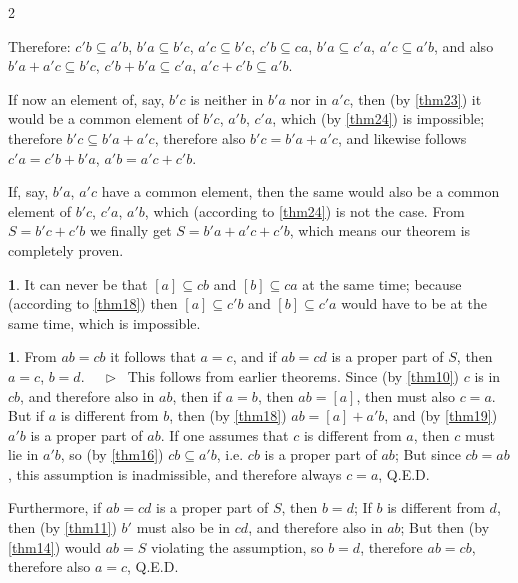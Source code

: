\documentclass[leqno,hidelinks,10pt]{article}
\theoremstyle{definition}
\newtheorem{satz}{\protect\satzname}
\newtheorem*{zusatz}{\protect\zusatzname}
\newcommand{\satzname}{}
\newcommand{\zusatzname}{}
\renewcommand{\satzname}{\hspace{-4pt}.\ Satz}%
\renewcommand{\zusatzname}{Zusatz}%
\renewcommand{\satzname}{\hspace{-4pt}.\ Theorem}%
\renewcommand{\zusatzname}{Corollary}%
\newcommand\Beweis{\medskip \newline $ \phantom{'.'} \rhd \ $}%
\newcommand{\QED}{Q.E.D.}
\newcommand{\partof}{\subseteq}
\newcommand{\sref}[1]{\underline{\ref{#1}}}%
\begin{document}
\begin{paracol}{2}
\begin{leftcolumn}

\end{leftcolumn}

\begin{rightcolumn}

\justifying

\normalsize

\noindent
Therefore: $c'b \partof a'b$, $b'a \partof b'c$, $a'c \partof b'c$,
$c'b \partof ca$, $b'a \partof c'a$, $a'c \partof a'b$, and also
$b'a + a'c \partof b'c$, $c'b + b'a \partof c'a$, $a'c + c'b \partof a'b$.



If now an element of, say, $b'c$ is neither in $b'a$ nor in $a'c$, then
(by \sref{thm23}) it would be a common element of $b'c$, $a'b$, $c'a$,
which (by \sref{thm24}) is impossible; therefore $b'c \partof b'a + a'c$,
therefore also $b'c=b'a + a'c$, and likewise follows $c'a=c'b+b'a$, $a'b=a'c+c'b$.

If, say, $b'a$, $a'c$ have a common element, then the same would also be a common
element of $b'c$, $c'a$, $a'b$, which (according to \sref{thm24}) is not the case.
From $S=b'c+c'b$ we finally get $S=b'a+a'c+c'b$, which means our theorem is
completely proven.

\begin{zusatz}
It can never be that $[a] \partof cb$ and $[b] \partof ca$ at the same time;
because (according to \sref{thm18}) then $[a] \partof c'b$ and $[b] \partof c'a$
would have to be at the same time, which is impossible.
\end{zusatz}

\begin{satz}\label{thm26}
From $ab=cb$ it follows that $a=c$, and if $ab=cd$ is a proper part of $S$,
then $a=c$, $b = d$.
\Beweis
This follows from earlier theorems.
Since (by \sref{thm10}) $c$ is in $cb$, and therefore also in $ab$, then if
$a=b$, then $ab = [a]$, then must also $c=a$. But if $a$ is different from $b$,
then (by \sref{thm18}) $ab = [a]+a'b$, and (by \sref{thm19}) $a'b$ is a proper
part of $ab$. If one assumes that $c$ is different from $a$, then $c$ must lie
in $a'b$, so (by \sref{thm16}) $cb \partof a'b$, i.e. $cb$ is a proper part of $ab$;
But since $cb=ab$, this assumption is inadmissible, and therefore always $c=a$, \QED

Furthermore, if $ab=cd$ is a proper part of $S$, then $b=d$; If $b$ is different
from $d$, then (by \sref{thm11}) $b'$ must also be in $cd$, and therefore also in
$ab$; But then (by \sref{thm14}) would $ab = S$ violating the assumption, so $b=d$,
therefore $ab=cb$, therefore also $a=c$, \QED
\end{satz}


\end{rightcolumn}
\end{paracol}
\end{document}
